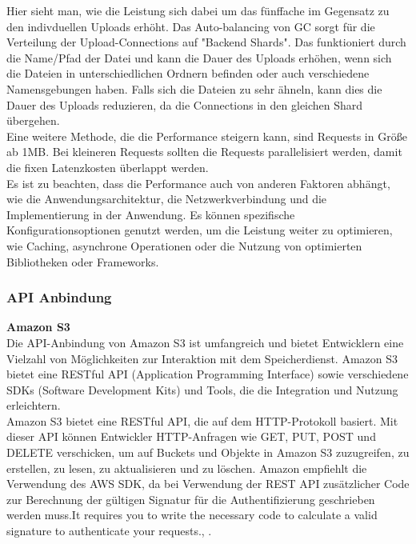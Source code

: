 Hier sieht man, wie die Leistung sich dabei um das fünffache im Gegensatz zu den indivduellen Uploads erhöht. Das Auto-balancing von GC sorgt für die Verteilung der Upload-Connections auf "Backend Shards". Das funktioniert durch die Name/Pfad der Datei und kann die Dauer des Uploads erhöhen, wenn sich die Dateien in unterschiedlichen Ordnern befinden oder auch verschiedene Namensgebungen haben. Falls sich die Dateien zu sehr ähneln, kann dies die Dauer des Uploads reduzieren, da die Connections in den gleichen Shard übergehen.\\

Eine weitere Methode, die die Performance steigern kann, sind Requests in Größe ab 1MB. Bei kleineren Requests sollten die Requests parallelisiert werden, damit die fixen Latenzkosten überlappt werden.\\

Es ist zu beachten, dass die Performance auch von anderen Faktoren abhängt, wie die Anwendungsarchitektur, die Netzwerkverbindung und die Implementierung in der Anwendung. Es können spezifische Konfigurationsoptionen genutzt werden, um die Leistung weiter zu optimieren, wie Caching, asynchrone Operationen oder die Nutzung von optimierten Bibliotheken oder Frameworks. 

\newpage

\subsubsection{API Anbindung}

\textbf{Amazon S3}\\

Die API-Anbindung von Amazon S3 ist umfangreich und bietet Entwicklern eine Vielzahl von Möglichkeiten zur Interaktion mit dem Speicherdienst. Amazon S3 bietet eine RESTful API (Application Programming Interface) sowie verschiedene SDKs (Software Development Kits) und Tools, die die Integration und Nutzung erleichtern.\\

Amazon S3 bietet eine RESTful API, die auf dem HTTP-Protokoll basiert. Mit dieser API können Entwickler HTTP-Anfragen wie GET, PUT, POST und DELETE verschicken, um auf Buckets und Objekte in Amazon S3 zuzugreifen, zu erstellen, zu lesen, zu aktualisieren und zu löschen. Amazon empfiehlt die Verwendung des AWS SDK, da bei Verwendung der REST API zusätzlicher Code zur Berechnung der gültigen Signatur für die Authentifizierung geschrieben werden muss.\glqq It requires you to write the necessary code to calculate a valid signature to authenticate your requests.\grqq, \cite{aws-api}.\\

